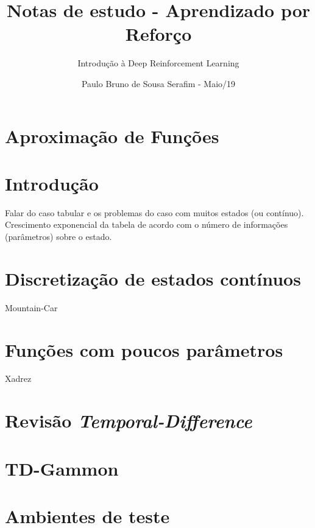 \documentclass{article}
\title{Notas de estudo - Aprendizado por Reforço}
\author{Introdução à Deep Reinforcement Learning}
\date{Paulo Bruno de Sousa Serafim - Maio/19}
\begin{document}
\maketitle

    \section{Aproximação de Funções}

        \section{Introdução}
        
            Falar do caso tabular e os problemas do caso com muitos estados (ou contínuo). Crescimento exponencial da tabela de acordo com o número de informações (parâmetros) sobre o estado.
        
        \section{Discretização de estados contínuos}
            
            Mountain-Car
        
        \section{Funções com poucos parâmetros}
        
            Xadrez
    
    \section{Revisão \emph{Temporal-Difference}}
    
    \section{TD-Gammon}
    
    \section{Ambientes de teste}
    
\end{document}
